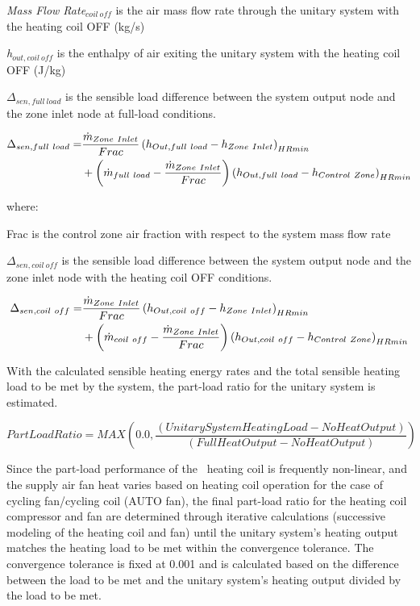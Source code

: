 \emph{Mass Flow Rate\(_{coil~off}\)} is the air mass flow rate through the unitary system with the heating coil OFF (kg/s)

\emph{h\(_{out,coil~off}\)} is the enthalpy of air exiting the unitary system with the heating coil OFF (J/kg)

\(\Delta_{sen,full~load}\) is the sensible load difference between the system output node and the zone inlet node at full-load conditions.

\begin{equation}
  \begin{split}
    \Delta_{sen,full~load} =& \frac{\dot{m}_{Zone~Inlet}}{Frac} \PB{h_{Out,full~load} - h_{Zone~Inlet}}_{HRmin} \\
                              &+ \PB{\dot{m}_{full~load} - \frac{\dot{m}_{Zone~Inlet}}{Frac}} \PB{h_{Out,full~load} - h_{Control~Zone}}_{HRmin}
  \end{split}
\end{equation}

where:

Frac is the control zone air fraction with respect to the system mass flow rate

\(\Delta_{sen,coil~off}\) is the sensible load difference between the system output node and the zone inlet node with the heating coil OFF conditions.

\begin{equation}
  \begin{split}
    \Delta_{sen,coil~off} =& \frac{\dot{m}_{Zone~Inlet}}{Frac} \PB{h_{Out,coil~off} - h_{Zone~Inlet}}_{HRmin} \\
                              &+ \PB{\dot{m}_{coil~off} - \frac{\dot{m}_{Zone~Inlet}}{Frac}} \PB{h_{Out,coil~off} - h_{Control~Zone}}_{HRmin}
  \end{split}
\end{equation}

With the calculated sensible heating energy rates and the total sensible heating load to be met by the system, the part-load ratio for the unitary system is estimated.

\begin{equation}
PartLoadRatio = MAX\left( {0.0,\frac{{\left( {UnitarySystemHeatingLoad - NoHeatOutput} \right)}}{{\left( {FullHeatOutput - NoHeatOutput} \right)}}} \right)
\end{equation}

Since the part-load performance of the~ heating coil is frequently non-linear, and the supply air fan heat varies based on heating coil operation for the case of cycling fan/cycling coil (AUTO fan), the final part-load ratio for the heating coil compressor and fan are determined through iterative calculations (successive modeling of the heating coil and fan) until the unitary system's heating output matches the heating load to be met within the convergence tolerance. The convergence tolerance is fixed at 0.001 and is calculated based on the difference between the load to be met and the unitary system's heating output divided by the load to be met.

